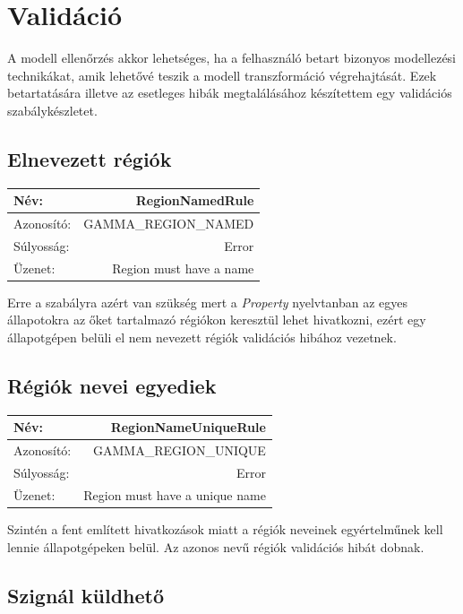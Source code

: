 \newpage
\section{Validáció}

A modell ellenőrzés akkor lehetséges, ha a felhasználó betart bizonyos modellezési technikákat, amik lehetővé teszik a modell transzformáció végrehajtását. Ezek betartatására illetve az esetleges hibák megtalálásához készítettem egy validációs szabálykészletet.


\subsection{Elnevezett régiók}

\begin{tabular}{ | l | r | }
	\hline
	Név: & RegionNamedRule  \\ 
	\hline
	Azonosító: & GAMMA\_REGION\_NAMED \\
	\hline
	Súlyosság: & Error \\  
	\hline
	Üzenet: & Region must have a name \\
	\hline
\end{tabular}\newline
\newline
Erre a szabályra azért van szükség mert a \emph{Property} nyelvtanban az egyes állapotokra az őket tartalmazó régiókon keresztül lehet hivatkozni, ezért egy állapotgépen belüli el nem nevezett régiók validációs hibához vezetnek.

\subsection{Régiók nevei egyediek}

\begin{tabular}{ | l | r | }
	\hline
	Név: & RegionNameUniqueRule  \\ 
	\hline
	Azonosító: & GAMMA\_REGION\_UNIQUE \\
	\hline
	Súlyosság: & Error \\  
	\hline
	Üzenet: & Region must have a unique name \\
	\hline
\end{tabular}\newline
\newline
Szintén a fent említett hivatkozások miatt a régiók neveinek egyértelműnek kell lennie állapotgépeken belül. Az azonos nevű régiók validációs hibát dobnak.

\subsection{Szignál küldhető}

